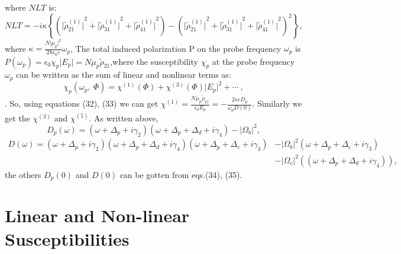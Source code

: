 \documentclass[12pt,a4paper]{article}
\begin{document}
where \(NLT\) is:
\begin{equation}
      {NLT} =  {-i\kappa}{\left\lbrace{{\left({\vert\tilde\rho^{(1)}_{21}\vert}^{2}+{\vert\tilde\rho^{(1)}_{31}\vert}^{2}+{\vert\tilde\rho^{(1)}_{41}\vert}^{2}\right)}-{\left({\vert\tilde\rho^{(1)}_{21}\vert}^{2}+{\vert\tilde\rho^{(1)}_{31}\vert}^{2}+{\vert\tilde\rho^{(1)}_{41}\vert}^{2}\right)}^2}\right\rbrace},
\end{equation}
where \(\kappa=\frac{N\vert\mu_p\vert^2}{2\hbar\epsilon_0c}\omega_p\), The total induced polarization P on the probe frequency \(\omega_p\) is \({P}(\omega_p)=\epsilon_0\chi_p\vert E_p\vert=N\mu_p\tilde\rho_{21}\),where the susceptibility \(\chi_p\) at the probe frequency \(\omega_p\) can be written as the sum of linear and nonlinear terms as:
\begin{equation}
    \chi_p(\omega_p,\ \Phi)=\chi^{(1)}(\Phi)+\chi^{(3)}(\Phi)\vert E_p\vert^2+\cdots \ ,
\end{equation}.
So, using equations (32), (33) we can get \(\chi^{(1)}=\frac{N\mu_p\tilde\rho_{21}}{\epsilon_0E_p}=-\frac{2\kappa cD_p}{\omega_p D(0)}\). Similarly we get the \(\chi^{(3)}\) and \(\chi^{(5)}\).
As written above, 
\begin{equation}
    D_p(\omega)=(\omega+\Delta_p+i\gamma_2)(\omega+\Delta_p+\Delta_d+i\gamma_4)-|\Omega_b|^2,
\end{equation}
\begin{align}
    D(\omega)=(\omega+\Delta_p+i\gamma_2)(\omega+\Delta_p+\Delta_d+i\gamma_4)(\omega+\Delta_p+\Delta_c+i\gamma_3)&-|\Omega_b|^2(\omega+\Delta_p+\Delta_c+i\gamma_3)\nonumber\\ &-|\Omega_c|^2((\omega+\Delta_p+\Delta_d+i\gamma_4)),
\end{align}
the others \(D_p(0)\) and \(D(0)\) can be gotten from eqs.(34), (35).

\section{Linear and Non-linear Susceptibilities}
\end{document}
